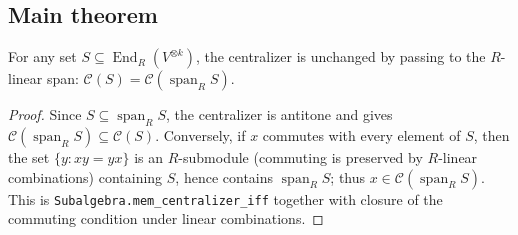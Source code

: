 \subsection{Main theorem}

\begin{lemma}
    \label{lem:centralizer-span}
    \leanok
    For any set $S \subseteq \operatorname{End}_R(V^{\otimes k})$, the centralizer is unchanged by passing
    to the $R$-linear span: $\mathcal{C}(S) = \mathcal{C}(\operatorname{span}_R S)$.
\end{lemma}
\begin{proof}
    Since $S \subseteq \operatorname{span}_R S$, the centralizer is antitone and gives
    $\mathcal{C}(\operatorname{span}_R S) \subseteq \mathcal{C}(S)$. Conversely, if $x$ commutes with
    every element of $S$, then the set $\{y : x y = y x\}$ is an $R$-submodule (commuting is preserved
    by $R$-linear combinations) containing $S$, hence contains $\operatorname{span}_R S$; thus
    $x \in \mathcal{C}(\operatorname{span}_R S)$. This is \texttt{Subalgebra.mem\_centralizer\_iff}
    together with closure of the commuting condition under linear combinations.
\end{proof}

